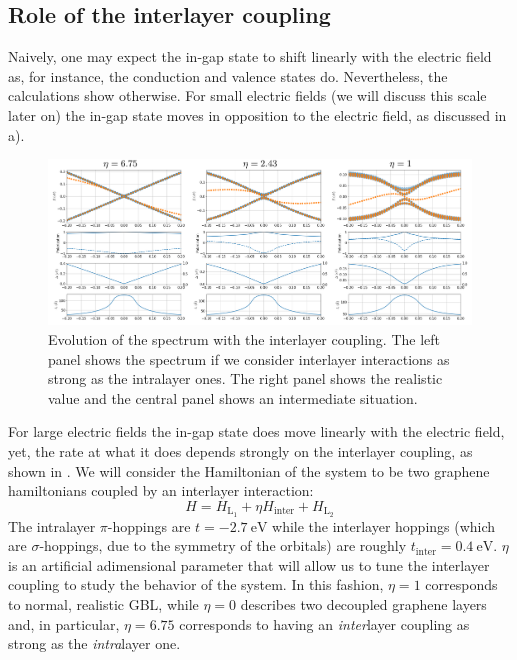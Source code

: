 \subsection{Role of the interlayer coupling}
Naively, one may expect the in-gap state to shift linearly with the electric field as, for instance, the conduction and valence states do. Nevertheless, the calculations show otherwise.
For small electric fields (we will discuss this scale later on) the in-gap state moves in opposition to the electric field, as discussed in a).
\begin{figure}[!ht!]
\centering
\includegraphics{artlat/fig/ingap_interlayer.pdf}
\vspace{-15pt}
\caption{Evolution of the spectrum with the interlayer coupling. The left panel shows the spectrum if we consider interlayer interactions as strong as the intralayer ones. The right panel shows the realistic value and the central panel shows an intermediate situation.}
\label{ingap_interlayer}
\end{figure}
For large electric fields the in-gap state does move linearly with the electric field, yet, the rate at what it does depends strongly on the interlayer coupling, as shown in .
We will consider the Hamiltonian of the system to be two graphene hamiltonians coupled by an interlayer interaction:
\begin{equation}
  H = H_{\text{L}_1} + \eta H_{\text{inter}} + H_{\text{L}_2}
\end{equation}
The intralayer $\pi$-hoppings are $t=\SI{-2.7}{\eV}$ while the interlayer hoppings (which are $\sigma$-hoppings, due to the symmetry of the orbitals) are roughly $t_{\text{inter}}=\SI{0.4}{\eV}$. $\eta$ is an artificial adimensional parameter that will allow us to tune the interlayer coupling to study the behavior of the system. In this fashion, $\eta=1$ corresponds to normal, realistic GBL, while $\eta=0$ describes two decoupled graphene layers and, in particular, $\eta=6.75$ corresponds to having an \emph{inter}layer coupling as strong as the \emph{intra}layer one.\\

